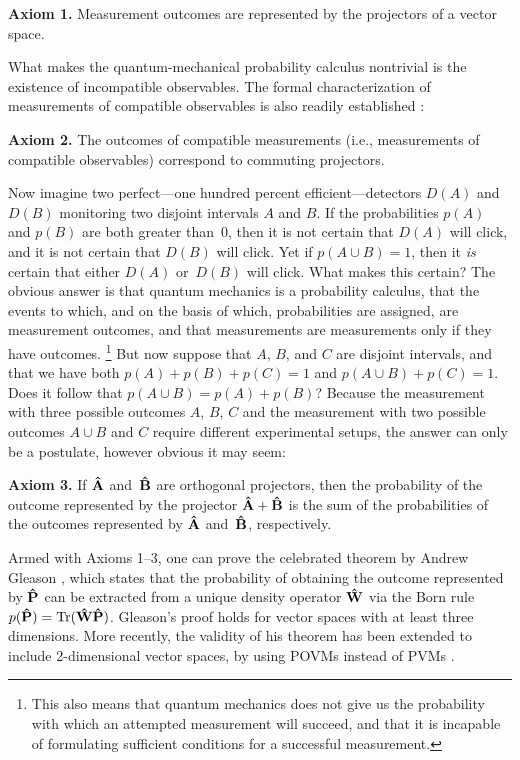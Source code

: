 \documentclass[12pt]{article}
\newcommand{\hA}{{\bf\hat A}}
\newcommand{\hB}{{\bf\hat B}}
\newcommand{\hP}{{\bf\hat P}}
\newcommand{\hW}{{\bf\hat W}}
\newcommand{\Tr}{\hbox{Tr}}
\begin{document}
\medskip\noindent\textbf{Axiom 1.} {Measurement outcomes are represented by the projectors of a vector space.}

\medskip\noindent What makes the quantum-mechanical probability calculus nontrivial is the existence of incompatible observables. The formal characterization of measurements of compatible observables is also readily established \cite{Mohrhoff-QMexplained}:

\medskip\noindent\textbf{Axiom 2.} {The outcomes of compatible measurements (i.e., measurements of compatible observables) correspond to commuting projectors.}

\medskip\noindent Now imagine two perfect---one hundred percent efficient---detectors $D(A)$ and $D(B)$ monitoring two disjoint intervals $A$ and $B$. If the probabilities $p({A})$ and $p({B})$ are both greater than~0, then it is not certain that $D(A)$ will click, and it is not certain that $D(B)$ will click. Yet if $p({A}\cup {B})=1$, then it \textit{is} certain that either $D(A)$ or~$D(B)$ will click. What makes this certain? The obvious answer is that quantum mechanics is a probability calculus, that the events to which, and on the basis of which, probabilities are assigned, are measurement outcomes, and that measurements are measurements only if they have outcomes.%
\footnote{This also means that quantum mechanics does not give us the probability with which an attempted measurement will succeed, and that it is incapable of formulating sufficient conditions for a successful measurement.}
But now suppose that $A$, $B$, and $C$ are disjoint intervals, and that we have both $p({A})+p({B})+p({C})=1$ and $p({A}\cup{B})+p({C})=1$.  Does it follow that  $p(A\cup B)=p(A)+p(B)$? Because the measurement with three possible outcomes $A$, $B$, $C$ and the measurement with two possible outcomes ${A}\cup{B}$ and ${C}$ require different experimental setups, the answer can only be a postulate, however obvious it may seem:

\medskip\noindent\textbf{Axiom 3.} If $\hA$ and~$\hB$ are orthogonal projectors, then the probability of the outcome represented by the projector $\hA+\hB$ is the sum of the probabilities of the outcomes represented by $\hA$ and~$\hB$, respectively.

\medskip\noindent Armed with Axioms 1--3, one can prove the celebrated theorem by Andrew Gleason \cite{Gleason}, which states that the probability of obtaining the outcome represented by $\hP$ can be extracted from a unique density operator $\hW$ via the Born rule $p(\hP)=\Tr(\hW\hP)$. Gleason's proof holds for vector spaces with at least three dimensions. More recently, the validity of his theorem has been extended to include 2-dimensional vector spaces, by using POVMs instead of PVMs \cite{Fuchs2001,Busch,Cavesetal}.
\end{document}
